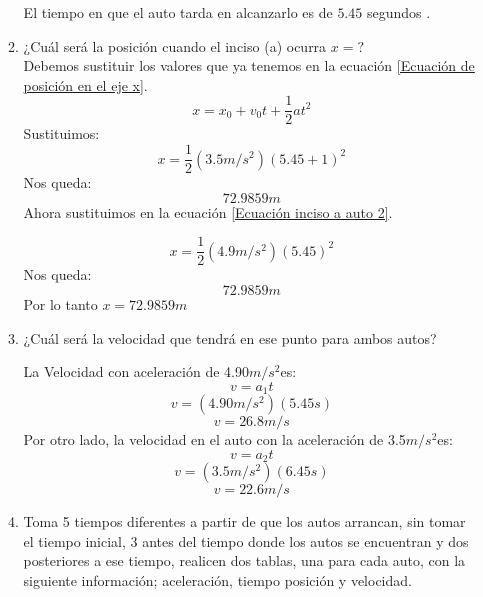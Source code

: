 \documentclass[letterpaper, 12pt]{article}
\begin{document}
\begin{enumerate}
\begin{enumerate}
El tiempo en que el auto tarda en alcanzarlo es de $5.45$ segundos .

    \item ¿Cuál será la posición cuando el inciso (a) ocurra $x=?$\\
Debemos sustituir los valores que ya tenemos en la ecuación \ref{Ecuación de posición en el eje x}.
    \begin{equation}
    x=x_0 + v_0 t + \frac{1}{2} at^2
    \end{equation}
Sustituimos:
    \begin{equation}
    x= \frac{1}{2} (3.5m/s^2)(5.45+1)^2
    \end{equation}
Nos queda:
\begin{equation}
    72.9859m
\end{equation}
Ahora sustituimos en la ecuación \ref{Ecuación inciso a auto 2}.

    \begin{equation}
    x= \frac{1}{2} (4.9m/s^2)(5.45)^2
    \end{equation}
Nos queda:
\begin{equation}
    72.9859m
\end{equation}
Por lo tanto $x=72.9859m$
    \item ¿Cuál será la velocidad que tendrá en ese punto para ambos autos?
    
La Velocidad con aceleración de 4.90$m/s^2$es:
\begin{equation}
    v = a_1 t
\end{equation}
\begin{equation}
    v = (4.90m/s^2)(5.45s)
\end{equation}
\begin{equation}
    v = 26.8 m/s
\end{equation}
Por otro lado, la velocidad en el auto con la aceleración de 3.5$m/s^2$es:
\begin{equation}
\label{Ecuación v}
    v = a_2 t
\end{equation}
\begin{equation}
    v = (3.5m/s^2)(6.45s)
\end{equation}
\begin{equation}
    v = 22.6 m/s
\end{equation}


    \item Toma 5 tiempos diferentes a partir de que los autos arrancan, sin tomar el tiempo inicial, 3 antes del tiempo donde los autos se encuentran y dos posteriores a ese tiempo, realicen dos tablas, una para cada auto, con la siguiente información; aceleración, tiempo posición y velocidad.\\



\end{enumerate}
\end{enumerate}
\end{document}
